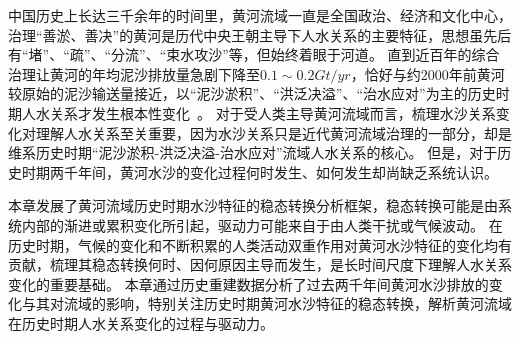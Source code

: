 

中国历史上长达三千余年的时间里，黄河流域一直是全国政治、经济和文化中心，治理“善淤、善决”的黄河是历代中央王朝主导下人水关系的主要特征，思想虽先后有“堵”、“疏”、“分流”、“束水攻沙”等，但始终着眼于河道\cite{WangWeiJing2009}。
直到近百年的综合治理让黄河的年均泥沙排放量急剧下降至$0.1\sim0.2 Gt/yr$，恰好与约$2000$年前黄河较原始的泥沙输送量接近，以“泥沙淤积”、“洪泛决溢”、“治水应对”为主的历史时期人水关系才发生根本性变化~\cite{wang2007,song2020, wang2016a}。
对于受人类主导黄河流域而言，梳理水沙关系变化对理解人水关系至关重要，因为水沙关系只是近代黄河流域治理的一部分，却是维系历史时期“泥沙淤积-洪泛决溢-治水应对”流域人水关系的核心。
但是，对于历史时期两千年间，黄河水沙的变化过程何时发生、如何发生却尚缺乏系统认识。


本章发展了黄河流域历史时期水沙特征的稳态转换分析框架，稳态转换可能是由系统内部的渐进或累积变化所引起，驱动力可能来自于由人类干扰或气候波动。
在历史时期，气候的变化和不断积累的人类活动双重作用对黄河水沙特征的变化均有贡献，梳理其稳态转换何时、因何原因主导而发生，是长时间尺度下理解人水关系变化的重要基础。
本章通过历史重建数据分析了过去两千年间黄河水沙排放的变化与其对流域的影响，特别关注历史时期黄河水沙特征的稳态转换，解析黄河流域在历史时期人水关系变化的过程与驱动力。


